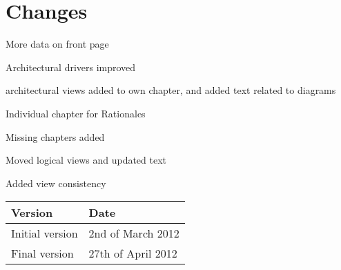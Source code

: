 \chapter{Changes}
\begin{list}{*}{} 
	\item More data on front page
	\item Architectural drivers improved
	\item architectural views added to own chapter, and added text related to diagrams
	\item Individual chapter for Rationales
	\item Missing chapters added
	\item Moved logical views and updated text
	\item Added view consistency
	
\end{list}

\begin{tabular}{| l | l |}
	\hline
	\rowcolor[gray]{0.8}
	\textbf{Version} & \textbf{Date} \\
	\hline
		Initial version &		2nd of March 2012 \\
		Final version &			27th of April 2012 \\
    \hline
\end{tabular}